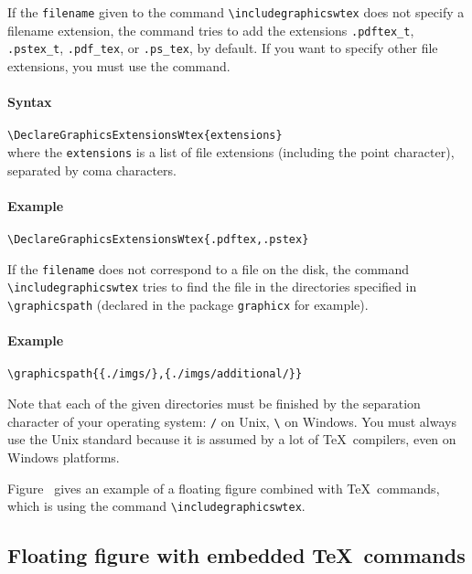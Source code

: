 \documentclass[book,taskpackage,specpackage,codepackage]{upmethodology-document}
\begin{document}
If the \texttt{filename} given to the command \texttt{{\textbackslash}includegraphicswtex} does not specify a filename extension, the command tries to add the extensions \texttt{.pdftex\_t}, \texttt{.pstex\_t}, \texttt{.pdf\_tex}, or \texttt{.ps\_tex}, by default. If you want to specify other file extensions, you must use the command.

\paragraph{Syntax} \texttt{{\textbackslash}DeclareGraphicsExtensionsWtex\{extensions\}} \\
where the \texttt{extensions} is a list of file extensions (including the point character), separated by coma characters.

\paragraph{Example} \texttt{{\textbackslash}DeclareGraphicsExtensionsWtex\{.pdftex,.pstex\}}

If the \texttt{filename} does not correspond to a file on the disk, the command \texttt{{\textbackslash}includegraphicswtex} tries to find the file in the directories specified in \texttt{{\textbackslash}graphicspath} (declared in the package \texttt{graphicx} for example). \\

\paragraph{Example} \texttt{{\textbackslash}graphicspath\{\{./imgs/\},\{./imgs/additional/\}\}} \\

\begin{upminfo}
	Note that each of the given directories must be finished by the separation character of your operating system: \texttt{/} on Unix, \texttt{\textbackslash} on Windows. You must always use the Unix standard because it is assumed by a lot of \TeX\ compilers, even on Windows platforms.
\end{upminfo}

Figure~ gives an example of a floating figure combined with \TeX\ commands, which is using the command \texttt{{\textbackslash}includegraphicswtex}.

\subsection{Floating figure with embedded \TeX\ commands}
\end{document}
